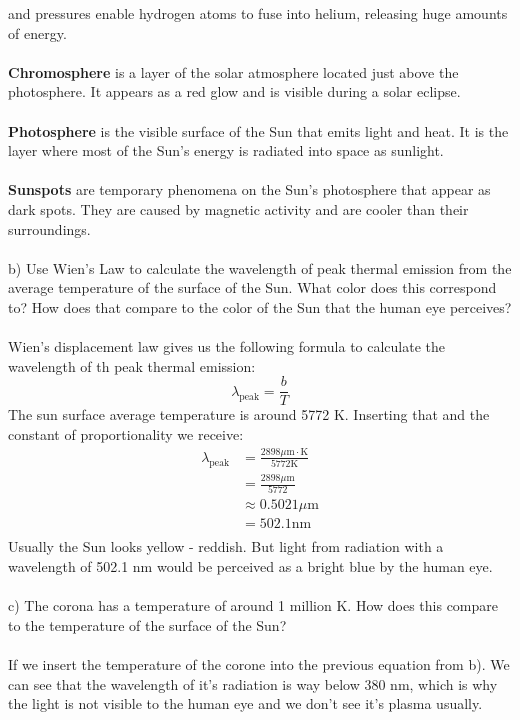 and pressures enable hydrogen atoms to fuse into helium, releasing huge amounts of energy.\\
\\
\textbf{Chromosphere} is a layer of the solar atmosphere located just above the photosphere. It appears as
a red glow and is visible during a solar eclipse.\\
\\
\textbf{Photosphere} is the visible surface of the Sun that emits light and heat. It is the layer where 
most of the Sun's energy is radiated into space as sunlight.\\
\\
\textbf{Sunspots} are temporary phenomena on the Sun's photosphere that appear as dark spots. They are 
caused by magnetic activity and are cooler than their surroundings.\\
\\
b) Use Wien's Law to calculate the wavelength of peak thermal emission from the average temperature of the
surface of the Sun. What color does this correspond to? How does that compare to the color of the Sun that
the human eye perceives?\\
\\
Wien's displacement law gives us the following formula to calculate the wavelength of th peak thermal emission:
\begin{equation*}
    \lambda_{\text{peak}} = \frac{b}{T}
\end{equation*}
The sun surface average temperature is around 5772 K. Inserting that and the constant of proportionality we
receive:
\begin{equation*}
    \begin{split}
        \lambda_{\text{peak}} &= \frac{2898 \mu \text{m} \cdot \text{K}}{5772 \text{K}}\\
                              &= \frac{2898 \mu \text{m}}{5772}\\
                              &\approx 0.5021 \mu \text{m}\\
                              &= 502.1 \text{nm}\\
    \end{split}
\end{equation*}
Usually the Sun looks yellow - reddish. But light from radiation with a wavelength of 502.1 nm would be
perceived as a bright blue by the human eye.\\
\\
c) The corona has a temperature of around 1 million K. How does this compare to the temperature of the
surface of the Sun?\\
\\
If we insert the temperature of the corone into the previous equation from b). We can see that the wavelength of
it's radiation is way below 380 nm, which is why the light is not visible to the human eye and we don't see it's
plasma usually.
